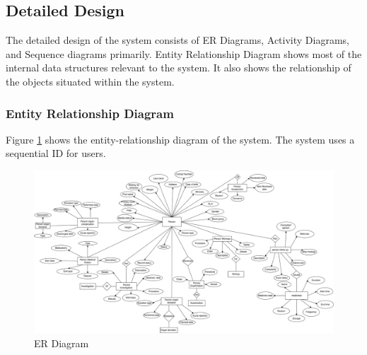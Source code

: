 \documentclass[12pt,a4paper]{report}
\begin{document}
\subsection{Detailed Design}
The detailed design of the system consists of ER Diagrams, Activity Diagrams, and Sequence diagrams primarily. Entity Relationship Diagram shows most of the internal data structures relevant to the system. It also shows the relationship of the objects situated within the system.

\subsubsection*{Entity Relationship Diagram}

Figure \ref{fig:er} shows the entity-relationship diagram of the system. The system uses a sequential ID for users.

\begin{figure}[h]
\begin{center}
\includegraphics[width=\textwidth]{images/er.png}	
\end{center}
\caption{ER Diagram}
\label{fig:er}
\end{figure}




\newpage 
\end{document}
